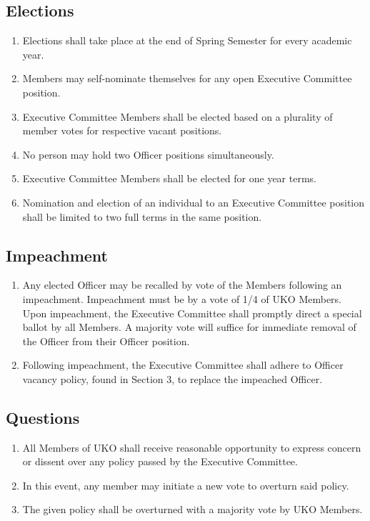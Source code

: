 \documentclass[12pt,executivepaper]{article}
\begin{document}
\subsection{Elections}
\begin{enumerate}
    \item Elections shall take place at the end of Spring Semester for every
          academic year.
    \item Members may self-nominate themselves for any open Executive Committee
          position.
    \item Executive Committee Members shall be elected based on a plurality of
          member votes for respective vacant positions.
    \item No person may hold two Officer positions simultaneously.
    \item Executive Committee Members shall be elected for one year terms.
    \item Nomination and election of an individual to an Executive Committee
          position shall be limited to two full terms in the same position.
\end{enumerate}

\subsection{Impeachment}
\begin{enumerate}
    \item Any elected Officer may be recalled by vote of the Members following
          an impeachment. Impeachment must be by a vote of 1/4 of UKO Members.
          Upon impeachment, the Executive Committee shall promptly direct a
          special ballot by all Members. A majority vote will suffice for
          immediate removal of the Officer from their Officer position.
    \item Following impeachment, the Executive Committee shall adhere to
          Officer vacancy policy, found in Section 3, to replace the impeached
          Officer.
\end{enumerate}

\subsection{Questions}
\begin{enumerate}
    \item All Members of UKO shall receive reasonable opportunity to express
          concern or dissent over any policy passed by the Executive Committee.
    \item In this event, any member may initiate a new vote to overturn said
          policy.
    \item The given policy shall be overturned with a majority vote by UKO
          Members.
\end{enumerate}
\end{document}
